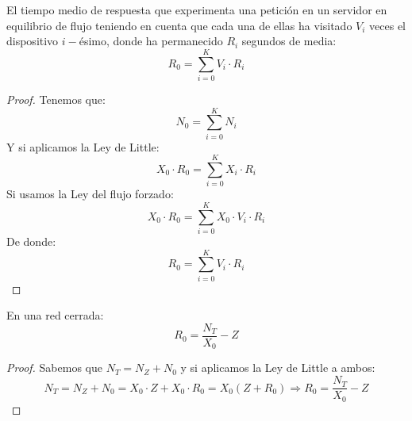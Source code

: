 \begin{prop}
    El tiempo medio de respuesta que experimenta una petición en un servidor en equilibrio de flujo teniendo en cuenta que cada una de ellas ha visitado $V_i$ veces el dispositivo $i-$ésimo, donde ha permanecido $R_i$ segundos de media:
    \begin{equation*}
        R_0 = \sum_{i=0}^{K} V_i \cdot R_i
    \end{equation*}
    \begin{proof}
        Tenemos que:
        \begin{equation*}
            N_0 = \sum_{i=0}^{K}N_i
        \end{equation*}
        Y si aplicamos la Ley de Little:
        \begin{equation*}
            X_0 \cdot R_0 = \sum_{i=0}^{K}X_i\cdot R_i
        \end{equation*}
        Si usamos la Ley del flujo forzado:
        \begin{equation*}
            X_0 \cdot R_0 = \sum_{i=0}^{K}X_0\cdot V_i\cdot R_i
        \end{equation*}
        De donde:
        \begin{equation*}
            R_0 = \sum_{i=0}^{K}V_i\cdot R_i
        \end{equation*}
    \end{proof}
\end{prop}

\begin{prop}
    En una red cerrada:
    \begin{equation*}
        R_0 = \dfrac{N_T}{X_0} - Z
    \end{equation*}
    \begin{proof}
        Sabemos que $N_T = N_Z + N_0$ y si aplicamos la Ley de Little a ambos:
        \begin{equation*}
            N_T = N_Z + N_0 = X_0 \cdot Z + X_0\cdot R_0 = X_0(Z+R_0) \Longrightarrow R_0 = \dfrac{N_T}{X_0}-Z
        \end{equation*}
    \end{proof}
\end{prop}
